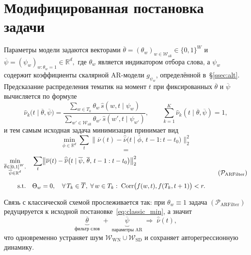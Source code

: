 \documentclass[14pt,a4paper]{article}
\begin{document}

\newpage
\section{Модифицированная постановка задачи} \label{ssec:modform}
Параметры модели задаются векторами 
\(
\overline{\theta}=(\theta_{w})_{w\in\mathcal{W}_{\mathrm{all}}}\in\{0,1\}^{W}
\) и 
\(
\overline{\psi}=(\psi_{w})_{w:\theta_{w}=1}\in\mathbb{R}^{d},
\)
где $\theta_{w}$ является индикатором отбора слова, а $\psi_{w}$ содержит коэффициенты скалярной AR-модели $g_{\psi_{w}}$, определённой в~\S\ref{ssec:alt}. Предсказание распределения тематик на момент $t$ при фиксированных $\overline{\theta}$ и $\overline{\psi}$ вычисляется по формуле 
\[
\widehat{\nu}_{k}\bigl(t\mid\overline{\theta},\overline{\psi}\bigr)=
\frac{\displaystyle\sum_{w\in T_{k}}\theta_{w}\,\widehat{s}(w,t\mid\psi_{w})}
     {\displaystyle\sum_{w'\in\mathcal{W}_{\mathrm{all}}}\theta_{w'}\,\widehat{s}(w',t\mid\psi_{w'})},
\qquad 
\sum_{k=1}^{K}\widehat{\nu}_{k}(t\mid\overline{\theta},\overline{\psi})=1,
\]
и тем самым исходная задача минимизации принимает вид 
\[
  \min_{\overline{\phi}\in\mathbb{R}^d}
  \sum_{t}
    \bigl\|
      \overline{\nu}(t)
      -
      \widehat{\overline{\nu}}\bigl(t \mid \overline{\phi},\,t-1:t-t_0\bigr)
    \bigr\|_{2}^{2}
\]
\[
  =
\]
\[
  \begin{aligned}
    \min_{\substack{\overline{\theta}\in[0,1]^W,\\\overline{\psi}\in\mathbb{R}^d}}\quad &
    \sum_{t}
      \bigl\|
        \overline{\nu}(t)
        -
        \widehat{\overline{\nu}}\bigl(t \mid \overline{\psi},\,\overline{\theta},\,t-1:t-t_0\bigr)
      \bigr\|_{2}^{2}
    \\[6pt]
    \text{s.t.}\quad &
      \Theta_{w} = 0,\quad
      \forall\,T_k\in\overline{T},\;
      \forall\,w\in T_k:\;\operatorname{Corr}\bigl(f(w,t),f(T_k,t+1)\bigr)<r.
  \end{aligned}
  \tag{$\mathcal P_{\mathrm{ARFilter}}$}
\]

Связь с классической схемой прослеживается так: при $\theta_{w}\equiv1$ задача $(\mathcal P_{\mathrm{ARFilter}})$ редуцируется к исходной постановке~\eqref{eq:classic_min}, а значит 
\[
\underbrace{\overline{\theta}}_{\text{фильтр слов}}
\;+\;
\underbrace{\overline{\psi}}_{\text{параметры AR}}
\;\Longrightarrow\;
\widehat{\overline{\nu}}(t),
\]
что одновременно устраняет шум $\mathcal{W}_{\mathrm{WN}}\cup\mathcal{W}_{\mathrm{SD}}$ и сохраняет авторегрессионную динамику.
\end{document}
